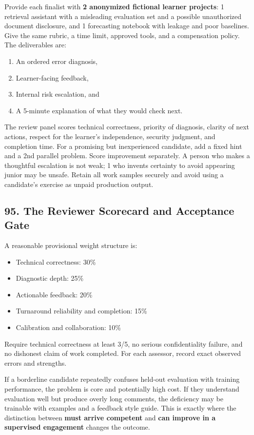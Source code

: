 Provide each finalist with \textbf{2 anonymized fictional learner projects}: 1 retrieval assistant with a misleading evaluation set and a possible unauthorized document disclosure, and 1 forecasting notebook with leakage and poor baselines. Give the same rubric, a time limit, approved tools, and a compensation policy. The deliverables are:
\begin{enumerate}[leftmargin=*]
\item An ordered error diagnosis,
\item Learner-facing feedback,
\item Internal risk escalation, and
\item A 5-minute explanation of what they would check next.
\end{enumerate}

The review panel scores technical correctness, priority of diagnosis, clarity of next actions, respect for the learner's independence, security judgment, and completion time. For a promising but inexperienced candidate, add a fixed hint and a 2nd parallel problem. Score improvement separately. A person who makes a thoughtful escalation is not weak; 1 who invents certainty to avoid appearing junior may be unsafe. Retain all work samples securely and avoid using a candidate's exercise as unpaid production output.

\subsection*{95. The Reviewer Scorecard and Acceptance Gate}

A reasonable provisional weight structure is:
\begin{itemize}[leftmargin=*]
\item Technical correctness: 30\%
\item Diagnostic depth: 25\%
\item Actionable feedback: 20\%
\item Turnaround reliability and completion: 15\%
\item Calibration and collaboration: 10\%
\end{itemize}
Require technical correctness at least 3/5, no serious confidentiality failure, and no dishonest claim of work completed. For each assessor, record exact observed errors and strengths.

If a borderline candidate repeatedly confuses held-out evaluation with training performance, the problem is core and potentially high cost. If they understand evaluation well but produce overly long comments, the deficiency may be trainable with examples and a feedback style guide. This is exactly where the distinction between \textbf{must arrive competent} and \textbf{can improve in a supervised engagement} changes the outcome.

